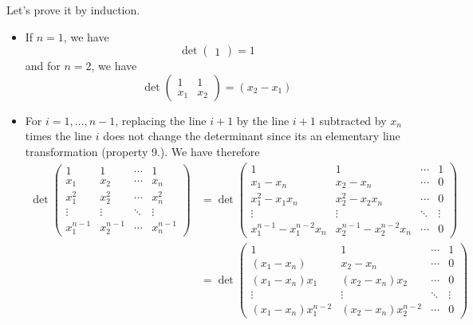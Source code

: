 \begin{solution}
  Let's prove it by induction.
  \begin{itemize}
    \item If $n = 1$, we have
      \[
        \det
        \begin{pmatrix}
          1
        \end{pmatrix}
        = 1
      \]
      and for $n = 2$, we have
      \[
        \det
        \begin{pmatrix}
          1 & 1\\
          x_1 & x_2
        \end{pmatrix}
        = (x_2 - x_1)
      \]
    \item
      For $i = 1, \ldots, n-1$, replacing the line $i+1$
      by the line $i+1$ subtracted by $x_n$ times the line $i$
      does not change the determinant since
      its an elementary line transformation (property 9.).
      We have therefore
      \begin{align*}
        \det
        \begin{pmatrix}
          1 & 1 & \cdots & 1\\
          x_1 & x_2 & \cdots & x_n\\
          x_1^2 & x_2^2 & \cdots & x_n^2\\
          \vdots & \vdots & \ddots & \vdots\\
          x_1^{n-1} & x_2^{n-1} & \cdots & x_n^{n-1}
        \end{pmatrix}
        & =
        \det
        \begin{pmatrix}
          1 & 1 & \cdots & 1\\
          x_1-x_n & x_2-x_n & \cdots & 0\\
          x_1^2-x_1x_n & x_2^2 - x_2x_n & \cdots & 0\\
          \vdots & \vdots & \ddots & \vdots\\
          x_1^{n-1}-x_1^{n-2}x_n & x_2^{n-1}-x_2^{n-2}x_n & \cdots & 0
        \end{pmatrix}\\
        & =
        \det
        \begin{pmatrix}
          1 & 1 & \cdots & 1\\
          (x_1-x_n) & x_2-x_n & \cdots & 0\\
          (x_1-x_n)x_1 & (x_2-x_n)x_2 & \cdots & 0\\
          \vdots & \vdots & \ddots & \vdots\\
          (x_1-x_n)x_1^{n-2} & (x_2-x_n)x_2^{n-2} & \cdots & 0

\end{pmatrix}
\end{align*}
\end{itemize}
\end{solution}
